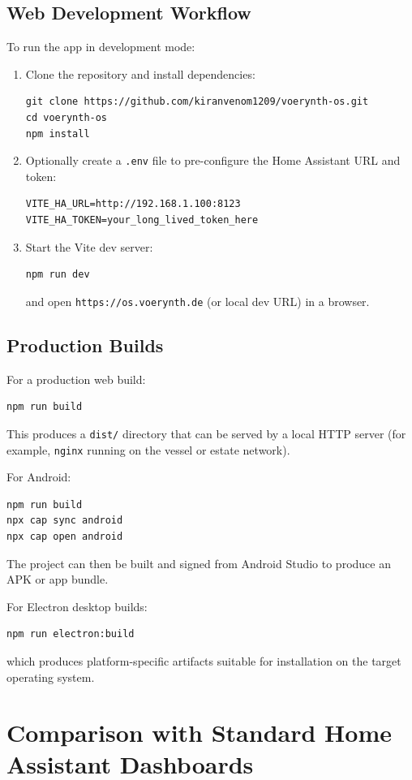 \documentclass[11pt,a4paper]{article}
\begin{document}
\subsection{Web Development Workflow}

To run the app in development mode:
\begin{enumerate}[leftmargin=*]
  \item Clone the repository and install dependencies:
  \begin{verbatim}
git clone https://github.com/kiranvenom1209/voerynth-os.git
cd voerynth-os
npm install
  \end{verbatim}
  \item Optionally create a \texttt{.env} file to pre-configure the Home Assistant URL and token:
  \begin{verbatim}
VITE_HA_URL=http://192.168.1.100:8123
VITE_HA_TOKEN=your_long_lived_token_here
  \end{verbatim}
  \item Start the Vite dev server:
  \begin{verbatim}
npm run dev
  \end{verbatim}
  and open \texttt{https://os.voerynth.de} (or local dev URL) in a browser.
\end{enumerate}

\subsection{Production Builds}

For a production web build:
\begin{verbatim}
npm run build
  \end{verbatim}
This produces a \texttt{dist/} directory that can be served by a local HTTP server (for example, \texttt{nginx} running on the vessel or estate network).

For Android:
\begin{verbatim}
npm run build
npx cap sync android
npx cap open android
  \end{verbatim}
The project can then be built and signed from Android Studio to produce an APK or app bundle.

For Electron desktop builds:
\begin{verbatim}
npm run electron:build
  \end{verbatim}
which produces platform-specific artifacts suitable for installation on the target operating system.

\section{Comparison with Standard Home Assistant Dashboards}
\end{document}

